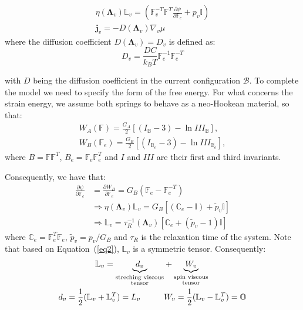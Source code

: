 \documentclass[12pt]{extarticle}
\newcommand{\F}{\ensuremath{\mathbb{F}}}
\newcommand{\B}{\ensuremath{\mathbb{B}}}
\newcommand{\LL}{\ensuremath{\mathbb{L}}}
\begin{document}
\begin{eqnarray}
\eta(\boldsymbol{\Lambda}_v)\LL_v= \left(\F_v^{-T}\F^{T} \frac{\partial \psi}{\partial \F_e}+p_v\mathbb{I}\right)\\
\mathbf{j}_v = -D(\boldsymbol{\Lambda}_v) \nabla_v \mu
\end{eqnarray}
where the diffusion coefficient $D(\boldsymbol{\Lambda}_v)=D_v$ is defined as:
\begin{equation}
D_v= \frac{DC}{k_BT} \F_e^{-1}\F_e^{-T}
\end{equation}

with $D$ being the diffusion coefficient in the current configuration $\mathcal{B}$.
To complete the model we need to specify the form of the free energy. For what concerns the strain energy, we assume both springs to behave as a neo-Hookean material, so that:
\begin{equation}
\begin{aligned}
W_A(\F) = \frac{G_A}{2} \left[(I_\B-3)-\ln III_\B\right],\\
W_B(\F_e) = \frac{G_B}{2} \left[(I_{\B_e}-3)-\ln III_{\B_e}\right],
\end{aligned}
\end{equation}
where $B=\F\F^T$, $B_e=\F_e\F_e^T$ and $I$ and $III$ are their first and third invariants.

Consequently, we have that:
\begin{equation}
\begin{aligned}
\frac{\partial \psi}{\partial \F_e}&=\frac{\partial W_B}{\partial \F_e}= G_B (\F_e-\F_e^{-T})\\%
&\Longrightarrow
\eta(\boldsymbol{\Lambda}_v)\LL_v=G_B \left[\left(\mathbb{C}_e-\mathbb{I}\right)+\tilde{p}_v\mathbb{I}\right]\\
&\Longrightarrow \LL_v= \tau_R^{-1}(\boldsymbol{\Lambda}_v) \left[\mathbb{C}_e+(\tilde{p}_v-1)\mathbb{I}\right]
\end{aligned}
\label{eq2}
\end{equation} 
where $\mathbb{C}_e=\F_e^T\F_e$, $\tilde{p}_v=p_v/G_B$ and $\tau_R$ is the relaxation time of the system. Note that based on Equation~(\ref{eq2}), $\LL_v$ is a symmetric tensor. Consequently:
\begin{equation}
\begin{aligned}
\LL_v = \underbrace{d_v}_{\substack{\text{streching viscous} \\ \text{tensor}}}& +\underbrace{W_v}_{\substack{\text{spin viscous} \\ \text{tensor}}} \\
d_v=\frac{1}{2} (\LL_v+\LL_v^T)=L_v\hspace{10mm}& W_v=\frac{1}{2} (\LL_v-\LL_v^T)= \mathbb{O}
\end{aligned}
\end{equation}
\end{document}
